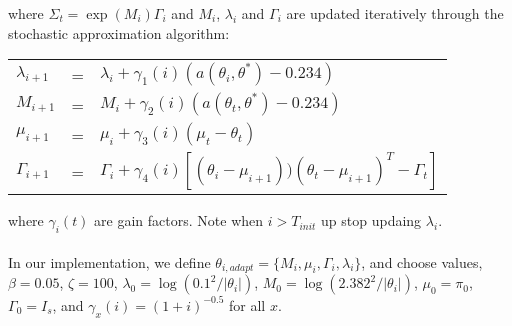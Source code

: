  
where $\Sigma_t = \exp(M_i)\Gamma_i$ and $M_{i}$, $\lambda_i$ and $\Gamma_{i}$ are updated iteratively through the stochastic approximation algorithm:
 \begin{center}
 \begin{tabular}{l l l}
  $\lambda_{i+1}$ & = & $ \lambda_i + \gamma_1(i)(a(\theta_i, \theta^*) - 0.234) $\\
 $M_{i+1}$& = & $M_i + \gamma_2(i)(a(\theta_t, \theta^*)- 0.234) $ \\
 $\mu_{i+1}$ & = & $\mu_i + \gamma_3(i)(\mu_t - \theta_t) $ \\
 $\Gamma_{i+1}$ & = & $ \Gamma_i + \gamma_4(i)[(\theta_i - \mu_{i+1}))(\theta_t - \mu_{i+1})^T - \Gamma_t]$ \\
\end{tabular} 
 \end{center}
 
 where $ \gamma_i(t)$ are gain factors. Note when $i > T_{init}$ up stop updaing $\lambda_i$.
 
 
\paragraph{}In our implementation, we define $\theta_{i, adapt} = \{M_i, \mu_i, \Gamma_i, \lambda_i\}$, and choose values, $\beta = 0.05$, $\zeta = 100$,  $\lambda_0 = \log(0.1^2/|\theta_i|)$, $M_0 = \log(2.382^2/|\theta_i|)$,  $\mu_0 = \pi_0$,  $\Gamma_0 = I_s$, and $\gamma_x(i) = (1 + i)^{-0.5}$ for all $x$. 

